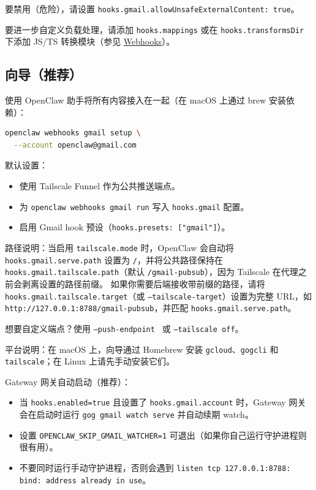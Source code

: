 要禁用（危险），请设置 \texttt{hooks.gmail.allowUnsafeExternalContent: true}。

要进一步自定义负载处理，请添加 \texttt{hooks.mappings} 或在 \texttt{hooks.transformsDir} 下添加 JS/TS 转换模块（参见 \href{/automation/webhook}{Webhooks}）。

\subsection{向导（推荐）}


使用 OpenClaw 助手将所有内容接入在一起（在 macOS 上通过 brew 安装依赖）：

\begin{lstlisting}[language=bash]
openclaw webhooks gmail setup \
  --account openclaw@gmail.com
\end{lstlisting}


默认设置：

\begin{itemize}
  \item 使用 Tailscale Funnel 作为公共推送端点。
  \item 为 \texttt{openclaw webhooks gmail run} 写入 \texttt{hooks.gmail} 配置。
  \item 启用 Gmail hook 预设（\texttt{hooks.presets: ["gmail"]}）。
\end{itemize}


路径说明：当启用 \texttt{tailscale.mode} 时，OpenClaw 会自动将 \texttt{hooks.gmail.serve.path} 设置为 \texttt{/}，并将公共路径保持在 \texttt{hooks.gmail.tailscale.path}（默认 \texttt{/gmail-pubsub}），因为 Tailscale 在代理之前会剥离设置的路径前缀。
如果你需要后端接收带前缀的路径，请将 \texttt{hooks.gmail.tailscale.target}（或 \texttt{--tailscale-target}）设置为完整 URL，如 \texttt{http://127.0.0.1:8788/gmail-pubsub}，并匹配 \texttt{hooks.gmail.serve.path}。

想要自定义端点？使用 \texttt{--push-endpoint } 或 \texttt{--tailscale off}。

平台说明：在 macOS 上，向导通过 Homebrew 安装 \texttt{gcloud}、\texttt{gogcli} 和 \texttt{tailscale}；在 Linux 上请先手动安装它们。

Gateway 网关自动启动（推荐）：

\begin{itemize}
  \item 当 \texttt{hooks.enabled=true} 且设置了 \texttt{hooks.gmail.account} 时，Gateway 网关会在启动时运行 \texttt{gog gmail watch serve} 并自动续期 watch。
  \item 设置 \texttt{OPENCLAW\_SKIP\_GMAIL\_WATCHER=1} 可退出（如果你自己运行守护进程则很有用）。
  \item 不要同时运行手动守护进程，否则会遇到 \texttt{listen tcp 127.0.0.1:8788: bind: address already in use}。
\end{itemize}


